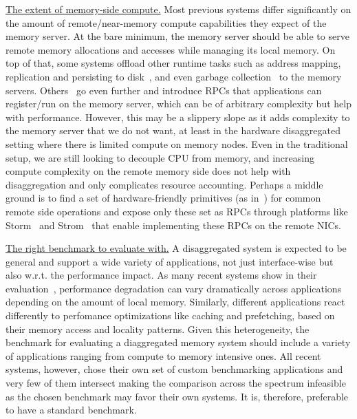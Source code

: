 \vspace{3pt}
\noindent \uline{The extent of memory-side compute.}
Most previous systems differ significantly on the 
amount of remote/near-memory compute capabilities they expect 
of the memory server. At the bare minimum, the memory server 
should be able to serve remote memory allocations and accesses while 
managing its local memory. On top of that, some systems offload 
other runtime tasks such as address mapping, replication and 
persisting to disk~\cite{legoos}, and even garbage 
collection~\cite{semeru} to the memory servers. 
Others~\cite{aifm,literdma} go even further and introduce 
RPCs that applications can register/run on the memory server, 
which can be of arbitrary complexity but help with performance. 
However, this may be a slippery slope as it adds 
complexity to the memory server that we do not want, at least in 
the hardware disaggregated setting where there is limited compute 
on memory nodes. Even in the traditional setup, we are still 
looking to decouple CPU from memory, and  increasing compute 
complexity on the remote memory side does not help with 
disaggregation and only complicates resource accounting. 
Perhaps a middle ground is to find a set of hardware-friendly 
primitives 
(as in~\cite{Aguilera2019}) for common remote side operations and 
expose only these set as RPCs through platforms like 
Storm~\cite{storm} and Strom~\cite{strom} that enable  
implementing these RPCs on the remote NICs. 

\vspace{3pt}
\noindent \uline{The right benchmark to evaluate with.}
A disaggregated system is expected to be general and support
a wide variety of applications, not just interface-wise but 
also w.r.t. the performance impact. As many recent 
systems show in their evaluation~\cite{netdisagg,legoos,fastswap}, 
performance degradation can vary dramatically across 
applications depending on the amount of local memory.
Similarly, different applications react differently to 
perfomance optimizations like caching and prefetching,
based on their memory access and locality patterns. 
Given this heterogeneity, the benchmark for evaluating a 
diaggregated memory system should include a variety of 
applications ranging from compute to memory intensive ones. 
All recent systems, however, chose their own set of custom 
benchmarking applications and very few of them intersect 
making the comparison across the spectrum infeasible as 
the chosen benchmark may favor their own systems. 
It is, therefore, preferable to have a standard benchmark.


